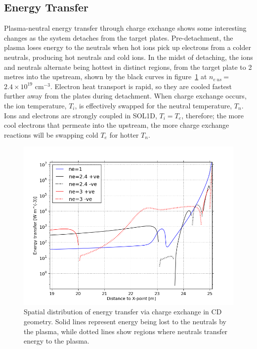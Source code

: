 \documentclass[12pt]{article}  %
\providecommand{\noNe}[1]{{${#1}\times 10^{19}$ cm$^{-3}$}} %
\providecommand{\neus}{$n_{e~us}~$} %
\begin{document}
\subsection{Energy Transfer}\label{ssecEtrans}
Plasma-neutral energy transfer through charge exchange shows some interesting changes as the system detaches from the target plates. Pre-detachment, the plasma loses energy to the neutrals when hot ions pick up electrons from a colder neutrals, producing hot neutrals and cold ions. In the midst of detaching, the ions and neutrals alternate being hottest in distinct regions, from the target plate to 2 metres into the upstream, shown by the black curves in figure~\ref{figbalEcx19m} at \neus = \noNe{2.4}. Electron heat transport is rapid, so they are cooled fastest further away from the plates during detachment. When charge exchange occurs, the ion temperature, $T_i$, is effectively swapped for the neutral temperature, $T_n$. Ions and electrons are strongly coupled in SOL1D, $T_i = T_e$, therefore; the more cool electrons that permeate into the upstream, the more charge exchange reactions will be swapping cold $T_e$ for hotter $T_n$.

\begin{figure}
\includegraphics[scale=0.7]{Figures/sol1d/balEcx19m.png}
\centering
\caption{Spatial distribution of energy transfer via charge exchange in CD geometry. Solid lines represent energy being lost to the neutrals by the plasma, while dotted lines show regions where neutrals transfer energy to the plasma.}\label{figbalEcx19m}
\end{figure}
\end{document}
